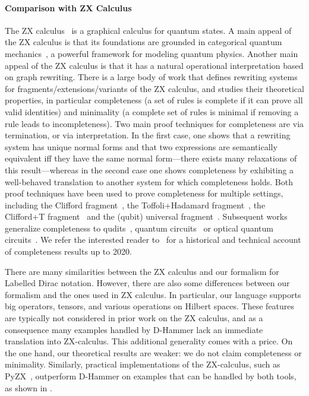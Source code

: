 \paragraph*{Comparison with ZX Calculus}
The ZX calculus~\cite{DBLP:conf/icalp/CoeckeD08,coecke2011interacting}
is a graphical calculus for quantum states. A main appeal of the ZX
calculus is that its foundations are grounded in categorical quantum
mechanics~\cite{DBLP:conf/lics/AbramskyC04}, a powerful framework for
modeling quantum physics. Another main appeal of the ZX calculus is
that it has a natural operational interpretation based on graph
rewriting. There is a large body of work that defines rewriting
systems for fragments/extensions/variants of the ZX calculus, and
studies their theoretical properties, in particular completeness (a
set of rules is complete if it can prove all valid identities) and
minimality (a complete set of rules is minimal if removing a rule
leads to incompleteness). Two main proof techniques for completeness
are via termination, or via interpretation. In the first case, one
shows that a rewriting system has unique normal forms and that two
expressions are semantically equivalent iff they have the same normal
form---there exists many relaxations of this result---whereas in the
second case one shows completeness by exhibiting a well-behaved
translation to another system for which completeness holds. Both proof
techniques have been used to prove completeness for multiple settings,
including the Clifford fragment~\cite{backens2014zx}, the
Toffoli+Hadamard fragment~\cite{hadzi15zx}, the Clifford+T
fragment~\cite{jeandel2018complete} and the (qubit) universal
fragment~\cite{HNW18,JeandelPV18beyond}. Subsequent works generalize
completeness to qudits~\cite{Poor2023}, quantum
circuits~\cite{DBLP:conf/lics/ClementHMPV23} or optical quantum
circuits~\cite{clement_et_al:2022}. We refer the interested reader
to~\cite{vandewetering2020zx} for a historical and technical account
of completeness results up to 2020.

There are many similarities between the ZX calculus and our formalism
for Labelled Dirac notation. However, there are also some differences
between our formalism and the ones used in ZX calculus. In particular,
our language supports big operators, tensors, and various operations
on Hilbert spaces. These features are typically not considered in
prior work on the ZX calculus, and as a consequence many examples
handled by D-Hammer lack an immediate translation into ZX-calculus.
This additional generality comes with a price. On the one hand, our
theoretical results are weaker: we do not claim completeness or
minimality. Similarly, practical implementations of the ZX-calculus,
such as PyZX~\cite{kissinger2020pyzx}, outperform D-Hammer on examples
that can be handled by both tools, as shown in .


